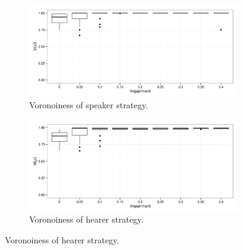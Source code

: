 \begin{figure}
        \begin{subfigure}{0.45\textwidth}
                \includegraphics[width=\textwidth]{plots/Speaker-Voronoiness-20140121-141158}
                \caption{Voronoiness of speaker strategy.}
        \end{subfigure}
        \begin{subfigure}{0.45\textwidth}
                \includegraphics[width=\textwidth]{plots/Hearer-Voronoiness-20140121-141158}
                \caption{Voronoiness of hearer strategy.}
        \end{subfigure}


\end{figure}
